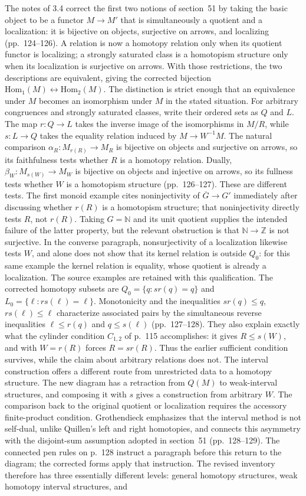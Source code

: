 The notes of 3.4 correct the first two notions of section~51 by taking the basic object to be a functor $M\to M'$ that is simultaneously a quotient and a localization: it is bijective on objects, surjective on arrows, and localizing (pp.~124--126). A relation is now a homotopy relation only when its quotient functor is localizing; a strongly saturated class is a homotopism structure only when its localization is surjective on arrows. With those restrictions, the two descriptions are equivalent, giving the corrected bijection $\mathrm{Hom}_1(M)\leftrightarrow\mathrm{Hom}_2(M)$. The distinction is strict enough that an equivalence under $M$ becomes an isomorphism under $M$ in the stated situation. For arbitrary congruences and strongly saturated classes, write their ordered sets as $Q$ and $L$. The map $r:Q\to L$ takes the inverse image of the isomorphisms in $M/R$, while $s:L\to Q$ takes the equality relation induced by $M\to W^{-1}M$. The natural comparison $\alpha_R:M_{r(R)}\to M_R$ is bijective on objects and surjective on arrows, so its faithfulness tests whether $R$ is a homotopy relation. Dually, $\beta_W:M_{s(W)}\to M_W$ is bijective on objects and injective on arrows, so its fullness tests whether $W$ is a homotopism structure (pp.~126--127). These are different tests. The first monoid example cites noninjectivity of $\overline G\to G'$ immediately after discussing whether $r(R)$ is a homotopism structure; that noninjectivity directly tests $R$, not $r(R)$. Taking $G=\mathbb N$ and its unit quotient supplies the intended failure of the latter property, but the relevant obstruction is that $\mathbb N\to\mathbb Z$ is not surjective. In the converse paragraph, nonsurjectivity of a localization likewise tests $W$, and alone does not show that its kernel relation is outside $Q_0$: for this same example the kernel relation is equality, whose quotient is already a localization. The source examples are retained with this qualification. The corrected homotopy subsets are $Q_0=\{q:sr(q)=q\}$ and $L_0=\{\ell:rs(\ell)=\ell\}$. Monotonicity and the inequalities $sr(q)\le q$, $rs(\ell)\le\ell$ characterize associated pairs by the simultaneous reverse inequalities $\ell\le r(q)$ and $q\le s(\ell)$ (pp.~127--128). They also explain exactly what the cylinder condition $C_{1,2}$ of p.~115 accomplishes: it gives $R\le s(W)$, and with $W=r(R)$ forces $R=sr(R)$. Thus the earlier sufficient condition survives, while the claim about arbitrary relations does not. The interval construction offers a different route from unrestricted data to a homotopy structure. The new diagram has a retraction from $Q(M)$ to weak-interval structures, and composing it with $s$ gives a construction from arbitrary $W$. The comparison back to the original quotient or localization requires the accessory finite-product condition. Grothendieck emphasizes that the interval method is not self-dual, unlike Quillen's left and right homotopies, and connects this asymmetry with the disjoint-sum assumption adopted in section~51 (pp.~128--129). The connected pen rules on p.~128 instruct a paragraph before this return to the diagram; the corrected forms apply that instruction. The revised inventory therefore has three essentially different levels: general homotopy structures, weak homotopy interval structures, and 